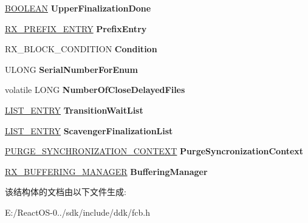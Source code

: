 \begin{DoxyCompactItemize}
\begin{tabbing}
\end{tabbing}\item 
\mbox{\label{struct___s_r_v___c_a_l_l_a3f892bb4e6ca4190279d81c4a2cbd559}} 
\hyperlink{_processor_bind_8h_a112e3146cb38b6ee95e64d85842e380a}{B\+O\+O\+L\+E\+AN} {\bfseries Upper\+Finalization\+Done}
\item 
\mbox{\label{struct___s_r_v___c_a_l_l_a6ed5165ac16dd94fd49b106e9cafcbf5}} 
\hyperlink{struct___r_x___p_r_e_f_i_x___e_n_t_r_y}{R\+X\+\_\+\+P\+R\+E\+F\+I\+X\+\_\+\+E\+N\+T\+RY} {\bfseries Prefix\+Entry}
\item 
\mbox{\label{struct___s_r_v___c_a_l_l_ad2212fdd13b6540acfb01c55465d3f63}} 
R\+X\+\_\+\+B\+L\+O\+C\+K\+\_\+\+C\+O\+N\+D\+I\+T\+I\+ON {\bfseries Condition}
\item 
\mbox{\label{struct___s_r_v___c_a_l_l_ae31ecb46eae596710be6da694a3692f2}} 
U\+L\+O\+NG {\bfseries Serial\+Number\+For\+Enum}
\item 
\mbox{\label{struct___s_r_v___c_a_l_l_aebace0b57cbb193eb01816f3b5892680}} 
volatile L\+O\+NG {\bfseries Number\+Of\+Close\+Delayed\+Files}
\item 
\mbox{\label{struct___s_r_v___c_a_l_l_a35dda10435df15a2dc894dd4ffbdcaad}} 
\hyperlink{struct___l_i_s_t___e_n_t_r_y}{L\+I\+S\+T\+\_\+\+E\+N\+T\+RY} {\bfseries Transition\+Wait\+List}
\item 
\mbox{\label{struct___s_r_v___c_a_l_l_a3ed2d5135faa4bec50a49a7c67ecea80}} 
\hyperlink{struct___l_i_s_t___e_n_t_r_y}{L\+I\+S\+T\+\_\+\+E\+N\+T\+RY} {\bfseries Scavenger\+Finalization\+List}
\item 
\mbox{\label{struct___s_r_v___c_a_l_l_aa23a873a7a37f85e22eebe75b6895f93}} 
\hyperlink{struct___p_u_r_g_e___s_y_n_c_h_r_o_n_i_z_a_t_i_o_n___c_o_n_t_e_x_t}{P\+U\+R\+G\+E\+\_\+\+S\+Y\+N\+C\+H\+R\+O\+N\+I\+Z\+A\+T\+I\+O\+N\+\_\+\+C\+O\+N\+T\+E\+XT} {\bfseries Purge\+Syncronization\+Context}
\item 
\mbox{\label{struct___s_r_v___c_a_l_l_a38cb5578e8f23df17c72c98e72122e63}} 
\hyperlink{struct___r_x___b_u_f_f_e_r_i_n_g___m_a_n_a_g_e_r__}{R\+X\+\_\+\+B\+U\+F\+F\+E\+R\+I\+N\+G\+\_\+\+M\+A\+N\+A\+G\+ER} {\bfseries Buffering\+Manager}
\end{DoxyCompactItemize}


该结构体的文档由以下文件生成\+:\begin{DoxyCompactItemize}
\item 
E\+:/\+React\+O\+S-\/0../sdk/include/ddk/fcb.\+h\end{DoxyCompactItemize}
